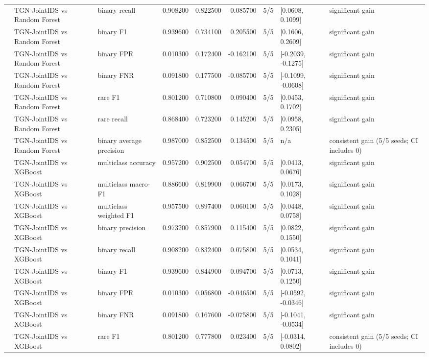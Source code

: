 \begin{table}
\begin{tabular}{lllrrrlll}
 & TGN-JointIDS vs Random Forest & binary recall & 0.908200 & 0.822500 & 0.085700 & 5/5 & [0.0608, 0.1099] & significant gain \\
 & TGN-JointIDS vs Random Forest & binary F1 & 0.939600 & 0.734100 & 0.205500 & 5/5 & [0.1606, 0.2609] & significant gain \\
 & TGN-JointIDS vs Random Forest & binary FPR & 0.010300 & 0.172400 & -0.162100 & 5/5 & [-0.2039, -0.1275] & significant gain \\
 & TGN-JointIDS vs Random Forest & binary FNR & 0.091800 & 0.177500 & -0.085700 & 5/5 & [-0.1099, -0.0608] & significant gain \\
 & TGN-JointIDS vs Random Forest & rare F1 & 0.801200 & 0.710800 & 0.090400 & 5/5 & [0.0453, 0.1702] & significant gain \\
 & TGN-JointIDS vs Random Forest & rare recall & 0.868400 & 0.723200 & 0.145200 & 5/5 & [0.0958, 0.2305] & significant gain \\
 & TGN-JointIDS vs Random Forest & binary average precision & 0.987000 & 0.852500 & 0.134500 & 5/5 & n/a & consistent gain (5/5 seeds; CI includes 0) \\
 & TGN-JointIDS vs XGBoost & multiclass accuracy & 0.957200 & 0.902500 & 0.054700 & 5/5 & [0.0413, 0.0676] & significant gain \\
 & TGN-JointIDS vs XGBoost & multiclass macro-F1 & 0.886600 & 0.819900 & 0.066700 & 5/5 & [0.0173, 0.1028] & significant gain \\
 & TGN-JointIDS vs XGBoost & multiclass weighted F1 & 0.957500 & 0.897400 & 0.060100 & 5/5 & [0.0448, 0.0758] & significant gain \\
 & TGN-JointIDS vs XGBoost & binary precision & 0.973200 & 0.857900 & 0.115400 & 5/5 & [0.0822, 0.1550] & significant gain \\
 & TGN-JointIDS vs XGBoost & binary recall & 0.908200 & 0.832400 & 0.075800 & 5/5 & [0.0534, 0.1041] & significant gain \\
 & TGN-JointIDS vs XGBoost & binary F1 & 0.939600 & 0.844900 & 0.094700 & 5/5 & [0.0713, 0.1250] & significant gain \\
 & TGN-JointIDS vs XGBoost & binary FPR & 0.010300 & 0.056800 & -0.046500 & 5/5 & [-0.0592, -0.0346] & significant gain \\
 & TGN-JointIDS vs XGBoost & binary FNR & 0.091800 & 0.167600 & -0.075800 & 5/5 & [-0.1041, -0.0534] & significant gain \\
 & TGN-JointIDS vs XGBoost & rare F1 & 0.801200 & 0.777800 & 0.023400 & 5/5 & [-0.0314, 0.0802] & consistent gain (5/5 seeds; CI includes 0) \\

\end{tabular}
\end{table}
